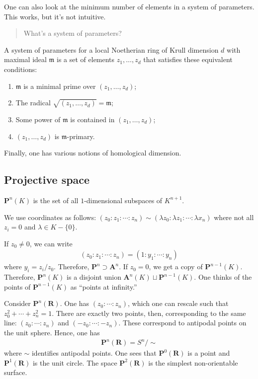 \documentclass [11 pt, oneside] {article}
\begin{document}
One can also look at the minimum number of elements in a system of parameters. This works, but it's not intuitive. 
\begin{quote}
	\small What's a system of parameters?
\end{quote}
A system of parameters for a local Noetherian ring of Krull dimension $d$ with maximal ideal $\mathfrak{m}$ is a set of elements $z_1,\hdots, z_d$ that satisfies these equivalent conditions:
\begin{enumerate}
	\item $\mathfrak{m}$ is a minimal prime over $(z_1,\hdots, z_d)$;
	\item The radical $\sqrt{(z_1,\hdots, z_d)}=\mathfrak{m} $;
	\item Some power of $\mathfrak{m}$ is contained in $(z_1,\hdots, z_d)$;
	\item $(z_1,\hdots, z_d)$ is $\mathfrak{m}$-primary.
\end{enumerate}

Finally, one has various notions of homological dimension.

\subsection{Projective space}
\begin{definition}[ ]\label{}
 $\mathbf{P}^n(K)$ is the set of all $1$-dimensional subspaces of $K^{n+1}$.
\end{definition}

We use coordinates as follows: $(z_0:z_1:\cdots : z_n)\sim (\lambda z_0:\lambda z_1:\cdots:\lambda x_n)$ where not all $z_i=0$ and $\lambda\in K - \{0\}$.

If $z_0\ne 0$, we can write
\begin{align*}
	(z_0:z_1:\cdots:z_n) = (1:y_1:\cdots : y_n)
\end{align*}
where $y_i = z_i/z_0$. Therefore, $\mathbf{P}^n \supset \mathbf{A}^n$. If $z_0=0$, we get a copy of $\mathbf{P}^{n-1}(K)$. Therefore, $\mathbf{P}^n(K)$ is a disjoint union $\mathbf{A}^n(K) \sqcup \mathbf{P}^{n-1}(K) $. One thinks of the points of $\mathbf{P}^{n-1}(K)$ as ``points at infinity.''

Consider $\mathbf{P}^n(\mathbf{R})$. One has $(z_0:\cdots:z_n)$, which one can rescale such that $z_0^2 +\cdots+z_n^2 = 1$. There are exactly two points, then, corresponding to the same line: $(z_0:\cdots:z_n)$ and $(-z_0:\cdots:-z_n)$. These correspond to antipodal points on the unit sphere. Hence, one has
\begin{align*}
	\mathbf{P}^n(\mathbf{R}) = S^n / \sim
\end{align*}
where $\sim$ identifies antipodal points. One sees that $\mathbf{P}^0(\mathbf{R})$ is a point and $\mathbf{P}^1(\mathbf{R})$ is the unit circle. The space $\mathbf{P}^2(\mathbf{R})$ is the simplest non-orientable surface.
\end{document}
